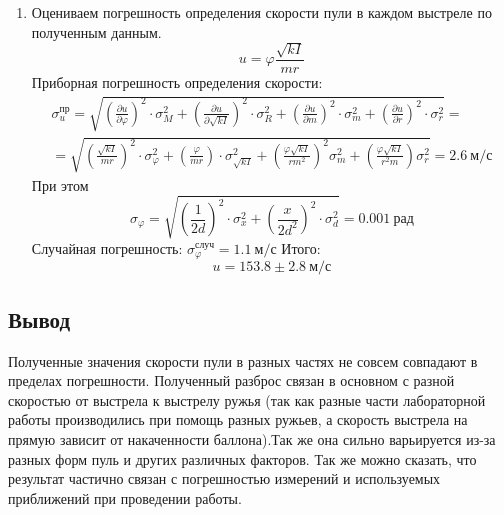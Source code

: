 \documentclass[a4paper,12pt]{article}
\begin{document}
\begin{enumerate}
    \item Оцениваем погрешность определения скорости пули в каждом выстреле по полученным данным.
    $$
    u = \varphi \frac{\sqrt{kI}}{mr}
    $$
    Приборная погрешность определения скорости:
    \begin{multline*}
        \sigma^{\text{пр}}_u = \sqrt{\left(\frac{\partial{u}}{\partial{\varphi}}\right)^2\cdot\sigma_M^2 + \left(\frac{\partial{u}}{\partial{\sqrt{kI}}}\right)^2\cdot \sigma_R^2 + \left(\frac{\partial{u}}{\partial{m}}\right)^2\cdot \sigma_{m}^2 + \left(\frac{\partial{u}}{\partial{r}}\right)^2\cdot \sigma_{r}^2} = \\
        = \sqrt{\left(\frac{\sqrt{kI}}{mr}\right)^2\cdot\sigma^2_{\varphi} + \left(\frac{\varphi}{mr}\right)\cdot\sigma^2_{\sqrt{kI}} + \left(\frac{\varphi\sqrt{kI}}{rm^2}\right)^2\sigma^2_m + \left(\frac{\varphi\sqrt{kI}}{r^2m}\right)\sigma^2_r} = 2.6~\text{м/с}
    \end{multline*}
    При этом
    $$
    \sigma_{\varphi} = \sqrt{\left(\frac{1}{2d}\right)^2\cdot \sigma_x^2 + \left(\frac{x}{2d^2}\right)^2\cdot \sigma_d^2 } = 0.001~\text{рад}
    $$
    Случайная погрешность: $\sigma_{\varphi}^{\text{случ}} = 1.1~\text{м/с}$
    Итого:
    $$
    u = 153.8 \pm 2.8~\text{м/с}
    $$
\end{enumerate}
\subsection*{Вывод}

Полученные значения скорости пули в разных частях не совсем совпадают в пределах погрешности. Полученный разброс связан в основном с разной скоростью от выстрела к выстрелу ружья (так как разные части лабораторной работы производились при помощь разных ружьев, а скорость выстрела на прямую зависит от накаченности баллона).Так же она сильно варьируется из-за разных форм пуль и других различных факторов. Так же можно сказать, что результат частично связан с погрешностью измерений и используемых приближений при проведении работы.
\end{document}
